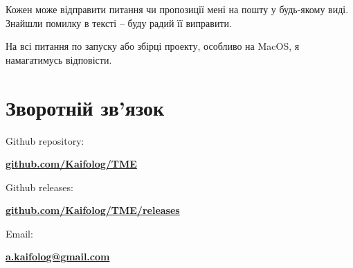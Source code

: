 \documentclass[oneside,final,14pt]{extreport}
\begin{document}
Кожен може відправити питання чи пропозиції мені на пошту у будь-якому виді. Знайшли помилку в тексті -- буду радий її виправити.

На всі питання по запуску або збірці проекту, особливо на MacOS, я намагатимусь відповісти.

\section*{Зворотній зв'язок}
Github repository:

{\bfseries \href{https://github.com/Kaifolog/TME}{github.com/Kaifolog/TME}}

Github releases:

{\bfseries \href{https://github.com/Kaifolog/TME/releases}{github.com/Kaifolog/TME/releases}}

Email:

{\bfseries \href{mailto:a.kaifolog@gmail.com}{a.kaifolog@gmail.com}}
\end{document}
